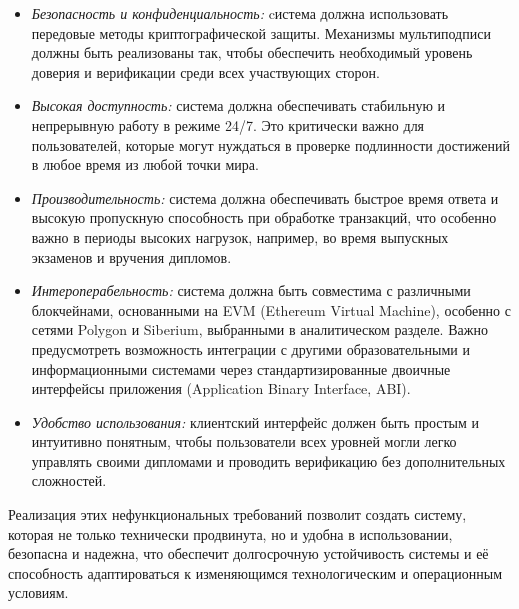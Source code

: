 \begin{itemize}
    \item \textit{Безопасность и конфиденциальность:} cистема должна использовать передовые методы криптографической защиты. Механизмы мультиподписи должны быть реализованы так, чтобы обеспечить необходимый уровень доверия и верификации среди всех участвующих сторон.
    \item \textit{Высокая доступность:} система должна обеспечивать стабильную и непрерывную работу в режиме 24/7. Это критически важно для пользователей, которые могут нуждаться в проверке подлинности достижений в любое время из любой точки мира.
    \item \textit{Производительность:} система должна обеспечивать быстрое время ответа и высокую пропускную способность при обработке транзакций, что особенно важно в периоды высоких нагрузок, например, во время выпускных экзаменов и вручения дипломов.
    \item \textit{Интероперабельность:} система должна быть совместима с различными блокчейнами, основанными на EVM (Ethereum Virtual Machine), особенно с сетями Polygon и Siberium, выбранными в аналитическом разделе. Важно предусмотреть возможность интеграции с другими образовательными и информационными системами через стандартизированные двоичные интерфейсы приложения (Application Binary Interface, ABI).
    \item \textit{Удобство использования:} клиентский интерфейс должен быть простым и интуитивно понятным, чтобы пользователи всех уровней могли легко управлять своими дипломами и проводить верификацию без дополнительных сложностей.
\end{itemize}

Реализация этих нефункциональных требований позволит создать систему, которая не только технически продвинута, но и удобна в использовании, безопасна и надежна, что обеспечит долгосрочную устойчивость системы и её способность адаптироваться к изменяющимся технологическим и операционным условиям.